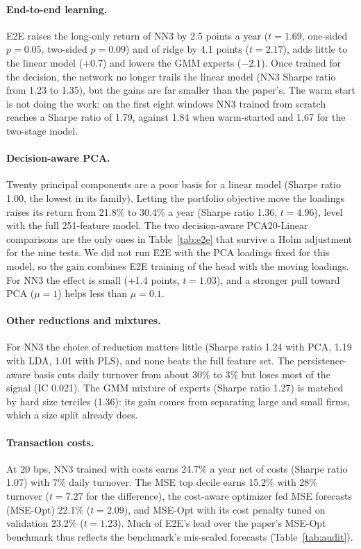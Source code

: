 \documentclass[10pt,a4paper]{article}
\begin{document}
\paragraph{End-to-end learning.} E2E raises the long-only return of NN3 by 2.5 points a year ($t=1.69$,
one-sided $p=0.05$, two-sided $p=0.09$) and of ridge by 4.1 points ($t=2.17$), adds little to the linear model
(+0.7) and lowers the GMM experts ($-2.1$). Once trained for the decision, the network no longer trails the
linear model (NN3 Sharpe ratio from 1.23 to 1.35), but the gains are far smaller than the paper's. The warm start
is not doing the work: on the first eight windows NN3 trained from scratch reaches a Sharpe ratio of 1.79,
against 1.84 when warm-started and 1.67 for the two-stage model.

\paragraph{Decision-aware PCA.} Twenty principal components are a poor basis for a linear model (Sharpe ratio
1.00, the lowest in its family). Letting the portfolio objective move the loadings raises its return from 21.8\%
to 30.4\% a year (Sharpe ratio 1.36, $t=4.96$), level with the full 251-feature model. The two decision-aware
PCA20-Linear comparisons are the only ones in Table~\ref{tab:e2e} that survive a Holm adjustment for the nine
tests. We did not run E2E with the PCA loadings fixed for this model, so the gain combines E2E training of the
head with the moving loadings. For NN3 the effect is small (+1.4 points, $t=1.03$), and a stronger pull toward
PCA ($\mu=1$) helps less than $\mu=0.1$.

\paragraph{Other reductions and mixtures.} For NN3 the choice of reduction matters little (Sharpe ratio 1.24 with
PCA, 1.19 with LDA, 1.01 with PLS), and none beats the full feature set. The persistence-aware basis cuts daily
turnover from about 30\% to 3\% but loses most of the signal (IC 0.021). The GMM mixture of experts (Sharpe ratio
1.27) is matched by hard size terciles (1.36): its gain comes from separating large and small firms, which a size
split already does.

\paragraph{Transaction costs.} At 20 bps, NN3 trained with costs earns 24.7\% a year net of costs (Sharpe ratio
1.07) with 7\% daily turnover. The MSE top decile earns 15.2\% with 28\% turnover ($t=7.27$ for the difference),
the cost-aware optimizer fed MSE forecasts (MSE-Opt) 22.1\% ($t=2.09$), and MSE-Opt with its cost penalty tuned on
validation 23.2\% ($t=1.23$). Much of E2E's lead over the paper's MSE-Opt benchmark thus reflects the benchmark's
mis-scaled forecasts (Table~\ref{tab:audit}).
\end{document}
